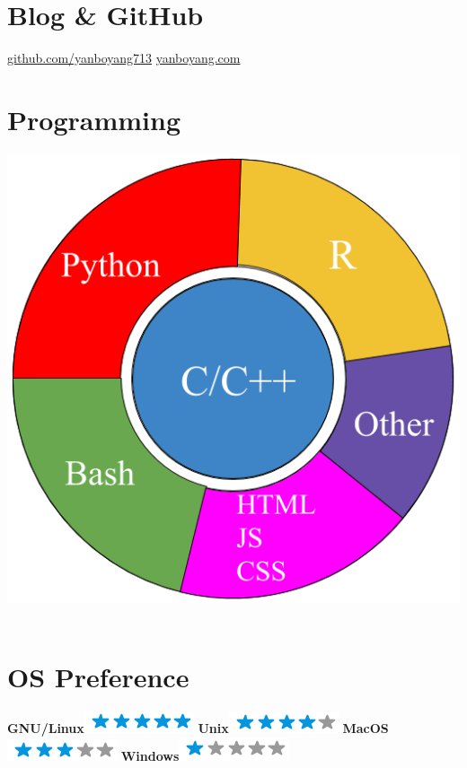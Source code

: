 \documentclass[]{friggeri-cv}
\begin{document}
\begin{aside}
  \section{Blog \& GitHub}
    \href{https://github.com/yanboyang713}{github.com/yanboyang713}
    \href{http://www.yanboyang.com}{yanboyang.com}
    ~
  \section{Programming}
    \includegraphics[scale=0.2]{img/programming.png}
    ~
  \section{OS Preference}
    \textbf{GNU/Linux}\includegraphics[scale=0.40]{img/5stars.png}
    \textbf{Unix}\includegraphics[scale=0.40]{img/4stars.png}
    \textbf{MacOS}\includegraphics[scale=0.40]{img/3stars.png}
    \textbf{Windows}\includegraphics[scale=0.40]{img/1stars.png}
    ~

\end{aside}
\end{document}
